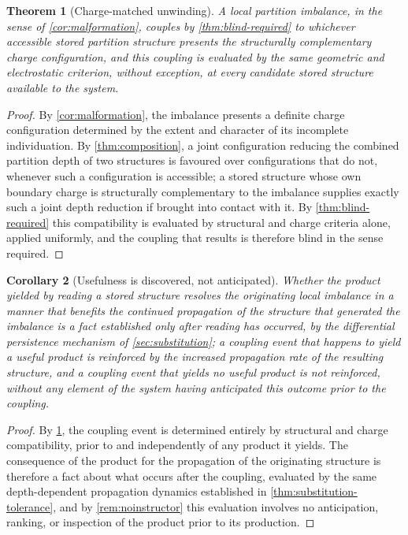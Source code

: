 \documentclass[11pt,twocolumn,a4paper]{article}
\theoremstyle{plain}
\newtheorem{theorem}{Theorem}[section]
\newtheorem{corollary}[theorem]{Corollary}
\theoremstyle{definition}
\theoremstyle{remark}
\begin{document}
\begin{theorem}[Charge-matched unwinding]
\label{thm:unwinding}
A local partition imbalance, in the sense of \cref{cor:malformation},
couples by \cref{thm:blind-required} to whichever accessible stored
partition structure presents the structurally complementary charge
configuration, and this coupling is evaluated by the same geometric and
electrostatic criterion, without exception, at every candidate stored
structure available to the system.
\end{theorem}

\begin{proof}
By \cref{cor:malformation}, the imbalance presents a definite charge
configuration determined by the extent and character of its incomplete
individuation. By \cref{thm:composition}, a joint configuration reducing the
combined partition depth of two structures is favoured over configurations
that do not, whenever such a configuration is accessible; a stored structure
whose own boundary charge is structurally complementary to the imbalance
supplies exactly such a joint depth reduction if brought into contact with
it. By \cref{thm:blind-required} this compatibility is evaluated by
structural and charge criteria alone, applied uniformly, and the coupling
that results is therefore blind in the sense required.
\end{proof}

\begin{corollary}[Usefulness is discovered, not anticipated]
\label{cor:retrospective}
Whether the product yielded by reading a stored structure resolves the
originating local imbalance in a manner that benefits the continued
propagation of the structure that generated the imbalance is a fact
established only after reading has occurred, by the differential
persistence mechanism of \cref{sec:substitution}; a coupling event that
happens to yield a useful product is reinforced by the increased
propagation rate of the resulting structure, and a coupling event that
yields no useful product is not reinforced, without any element of the
system having anticipated this outcome prior to the coupling.
\end{corollary}

\begin{proof}
By \cref{thm:unwinding}, the coupling event is determined entirely by
structural and charge compatibility, prior to and independently of any
product it yields. The consequence of the product for the propagation of
the originating structure is therefore a fact about what occurs after the
coupling, evaluated by the same depth-dependent propagation dynamics
established in \cref{thm:substitution-tolerance}, and by
\cref{rem:noinstructor} this evaluation involves no anticipation, ranking,
or inspection of the product prior to its production.
\end{proof}
\end{document}

